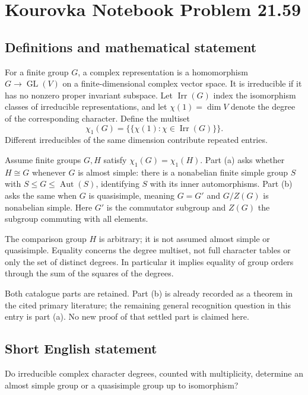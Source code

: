 \documentclass[11pt,a4paper]{article}
\begin{document}
\section*{Kourovka Notebook Problem 21.59}\label{statement}

\subsection{Definitions and mathematical statement}
For a finite group $G$, a complex representation is a homomorphism
$G\to\operatorname{GL}(V)$ on a finite-dimensional complex vector space.
It is irreducible if it has no nonzero proper invariant subspace.
Let $\operatorname{Irr}(G)$ index the isomorphism classes of irreducible
representations, and let $\chi(1)=\dim V$ denote the degree of the
corresponding character. Define the multiset
\[
 \chi_1(G)=\{\!\{\chi(1):\chi\in\operatorname{Irr}(G)\}\!\}.
\]
Different irreducibles of the same dimension contribute repeated entries.

Assume finite groups $G,H$ satisfy $\chi_1(G)=\chi_1(H)$.
Part (a) asks whether $H\cong G$ whenever $G$ is almost simple: there
is a nonabelian finite simple group $S$ with
$S\le G\le\operatorname{Aut}(S)$, identifying $S$ with its inner
automorphisms. Part (b) asks the same when $G$ is quasisimple, meaning
$G=G'$ and $G/Z(G)$ is nonabelian simple. Here $G'$ is the commutator
subgroup and $Z(G)$ the subgroup commuting with all elements.

The comparison group $H$ is arbitrary; it is not assumed almost simple
or quasisimple. Equality concerns the degree multiset, not full character
tables or only the set of distinct degrees. In particular it implies
equality of group orders through the sum of the squares of the degrees.

Both catalogue parts are retained. Part (b) is already recorded as a
theorem in the cited primary literature; the remaining general recognition
question in this entry is part (a). No new proof of that settled part
is claimed here.
\subsection{Short English statement}
Do irreducible complex character degrees, counted with multiplicity, determine an almost simple group or a quasisimple group up to isomorphism?
\end{document}
